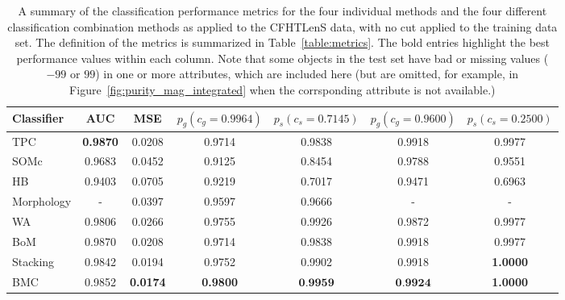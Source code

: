 \begin{table}
  \begin{tabular}{| l | c | c | c | c | c | c |}
  \hline
    Classifier & AUC & MSE &
    $p_{g}\left(c_g=0.9964\right)$ & $p_{s}\left(c_s=0.7145\right)$ &
    $p_{g}\left(c_g=0.9600\right)$ & $p_{s}\left(c_s=0.2500\right)$ \\
    \hline
    TPC        & \textbf{0.9870} & 0.0208 & 0.9714 & 0.9838 & 0.9918 & 0.9977 \\
    SOMc       & 0.9683 & 0.0452 & 0.9125 & 0.8454 & 0.9788 & 0.9551 \\
    HB         & 0.9403 & 0.0705 & 0.9219 & 0.7017 & 0.9471 & 0.6963 \\
    Morphology & - & 0.0397 & 0.9597 & 0.9666 & - & - \\
    WA         & 0.9806 & 0.0266 & 0.9755 & 0.9926 & 0.9872 & 0.9977 \\
    BoM        & 0.9870 & 0.0208 & 0.9714 & 0.9838 & 0.9918 & 0.9977 \\
    Stacking   & 0.9842 & 0.0194 & 0.9752 & 0.9902 & 0.9918 & \textbf{1.0000} \\
    BMC        & 0.9852 & \textbf{0.0174} & \textbf{0.9800} & $\textbf{0.9959}$ &
    $\textbf{0.9924}$ & \textbf{1.0000} \\
  \hline
  \end{tabular}
  \caption{A summary of the classification performance metrics
           for the four individual methods
           and the four different classification combination methods
           as applied to the CFHTLenS data,
           with no cut applied to the training data set.
           The definition of the metrics is summarized in
           Table~\ref{table:metrics}.
           The bold entries highlight the best performance values
           within each column.
           Note that some objects in the test set have bad or missing
           values (\eg $-99$ or $99$) in one or more attributes,
           which are included here (but are omitted, for example,
           in Figure~\ref{fig:purity_mag_integrated} when the corrsponding
           attribute is not available.)}
  \centering
  \label{table:metrics_all}
\end{table}

